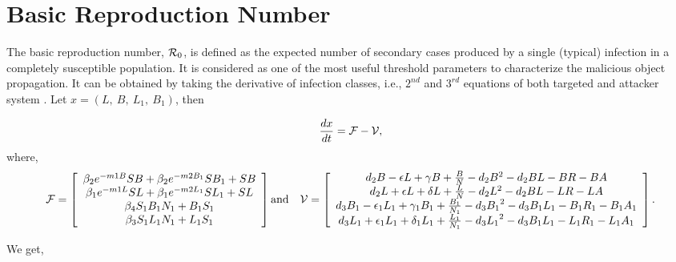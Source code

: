 \documentclass[12pt]{article}
\begin{document}
\section{Basic Reproduction Number }

The basic reproduction number, ${{\cal R}}_{0}$, is defined as the expected number of secondary cases produced by a single (typical) infection in a completely susceptible population. It is considered as one of the most useful threshold parameters to characterize the malicious object propagation. It can be obtained by taking the derivative of infection classes, i.e., $2^{nd}$ and $3^{rd}$ equations of both targeted and attacker system . Let $ x = (L, \  B,\ L_{1},\ B_{1})$, then

\[ \frac{dx}{dt} =  \cal{F}-\cal{V},   \]
where,  \[   \cal{F} = \left[
                         \begin{array}{c}
                          \beta _{2}e^{-m1 B}SB + \beta _{2}e^{-m2 B_{1}}SB_{1} + SB   \\
                          \beta _{1}e^{-m1 L}SL + \beta _{1}e^{-m2 L_{1}}SL_{1} + SL   \\
                          \beta_{4} S_{1}B_{1}N_{1} + B_{1}S_{1} \\
                          \beta_{3} S_{1}L_{1}N_{1} + L_{1}S_{1} \\
                         \end{array} \right]    \text{and} \quad     \cal{V} = \left[
                                                                           \begin{array}{c}
                                                                            d_2B-\epsilon L+\gamma B+\frac{B}{N}-d_{2}B^{2}-d_{2}BL-BR-BA\\
                                                                            d_2L+\epsilon L+\delta L+\frac{L}{N}-d_{2}L^{2}-d_{2}BL-LR-LA\\
                                                                            d_3B_{1}-\epsilon_{1}L_{1}+\gamma_{1}B_{1}+\frac{B_1}{N_1}-d_{3}{B_1}^{2}-d_{3}B_1L_1-B_1R_1-B_1A_1\\
                                                                            d_3L_{1}+\epsilon_{1}L_{1}+\delta_{1}L_{1}+\frac{L_1}{N_1}-d_{3}{L_1}^{2}-d_{3}B_1L_1-L_1R_1-L_1A_1
                                                                            \end{array} \right]. \]

We get, \\
\end{document}
